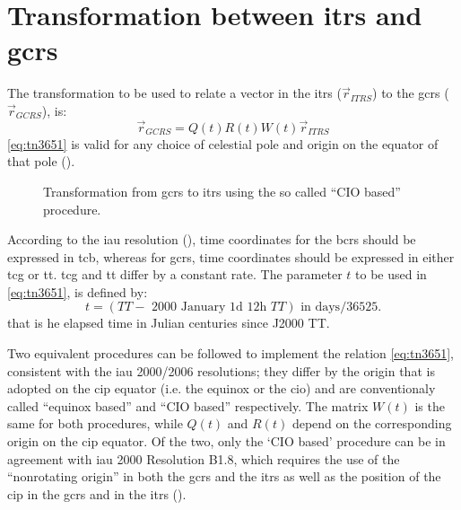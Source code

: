 \iffalse 
\section{Transformation between \gls{itrs} and \gls{gcrs}}
\label{transformation-itrs-gcrs}
The transformation to be used to relate a vector in the \gls{itrs} (\(\vec{r}_{ITRS}\)) 
to the \gls{gcrs} (\(\vec{r}_{GCRS}\)), is:
\begin{equation}
  \label{eq:tn3651}
  \vec{r}_{GCRS} = Q(t) R(t) W(t) \vec{r}_{ITRS}
\end{equation}
\ref{eq:tn3651} is valid for any choice of celestial pole and origin on the equator 
of that pole (\cite{iers2010}).

\begin{figure}
\centering

\caption{Transformation from \gls{gcrs} to \gls{itrs} using the so called ``CIO based'' procedure.}
\label{fig:bcrs-to-itrs}
\end{figure}

According to the \gls{iau} resolution (\cite{iers2010}), time coordinates for the 
\gls{bcrs} should be expressed in \gls{tcb}, whereas for \gls{gcrs}, time coordinates 
should be expressed in either \gls{tcg} or \gls{tt}. \gls{tcg} and \gls{tt} differ 
by a constant rate. The parameter \(t\) to be used in \ref{eq:tn3651}, is defined by:
\begin{equation}
  \label{eq:tn3652}
  t = (TT - \text{ 2000 January 1d 12h } TT) \text{ in days} / 36525.
\end{equation}
that is he elapsed time in Julian centuries since J2000 TT.

Two equivalent procedures can be followed to implement the relation \ref{eq:tn3651}, 
consistent with the \gls{iau} 2000/2006 resolutions; they differ by the origin 
that is adopted on the \gls{cip} equator (i.e. the equinox or the \gls{cio}) and 
are conventionaly called ``equinox based'' and ``CIO based'' respectively. The matrix 
\(W(t)\) is the same for both procedures, while \(Q(t)\) and \(R(t)\) depend on the 
corresponding origin on the \gls{cip} equator. Of the two, only the `CIO based'
procedure can be in agreement with \gls{iau} 2000 Resolution B1.8, which requires 
the use of the ``nonrotating origin'' in both the \gls{gcrs} and the \gls{itrs} as 
well as the position of the \gls{cip} in the \gls{gcrs} and in the \gls{itrs} 
(\cite{iers2010}).

